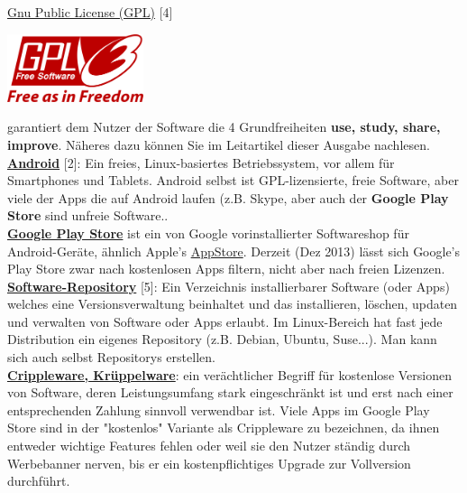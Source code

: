 \documentclass[10pt,a4paper,ngerman,twoside]{article} %
\begin{document}
\begin{multicols}{3}
\href{http://de.wikipedia.org/wiki/GNU_General_Public_License}{Gnu Public License (GPL)} [4]
\begin{center}
\includegraphics[width=4cm]{fdroid/fdroid_gpl_logo.png}
\end{center}
garantiert dem Nutzer der Software die 4 Grundfreiheiten \textbf{use, study, share, improve}. Näheres dazu können Sie im Leitartikel dieser Ausgabe nachlesen. \\

\href{http://www.android.com/}{\textbf{Android}} [2]: Ein freies, Linux-basiertes Betriebssystem, vor allem für Smartphones und Tablets. Android selbst ist GPL-lizensierte, freie Software, aber viele der Apps die auf Android laufen (z.B. Skype, aber auch der \textbf{Google Play Store} sind unfreie Software.. \\

\href{http://de.wikipedia.org/wiki/Google_Play}{\textbf{Google Play Store}} ist ein von Google vorinstallierter Softwareshop für Android-Geräte, ähnlich Apple's \href{http://de.wikipedia.org/wiki/AppStore}{AppStore}. Derzeit (Dez 2013) lässt sich Google's Play Store zwar nach kostenlosen Apps filtern, nicht aber nach freien Lizenzen. \\

\href{http://de.wikipedia.org/wiki/Repository}{\textbf{Software-Repository}} [5]: Ein Verzeichnis installierbarer Software (oder Apps) welches eine Versionsverwaltung beinhaltet und das installieren, löschen, updaten und verwalten von Software oder Apps erlaubt. Im Linux-Bereich hat fast jede Distribution ein eigenes Repository (z.B. Debian, Ubuntu, Suse...). Man kann sich auch selbst Repositorys erstellen. \\

\href{http://de.wikipedia.org/wiki/Crippleware}{\textbf{Crippleware, Krüppelware}}: ein verächtlicher Begriff für kostenlose Versionen von Software, deren Leistungsumfang stark eingeschränkt ist und erst nach einer entsprechenden Zahlung sinnvoll verwendbar ist. Viele Apps im Google Play Store sind in der "kostenlos" Variante als Crippleware zu bezeichnen, da ihnen entweder wichtige Features fehlen oder weil sie den Nutzer ständig durch Werbebanner nerven, bis er ein kostenpflichtiges Upgrade zur Vollversion durchführt.


\end{multicols}
\end{document}
